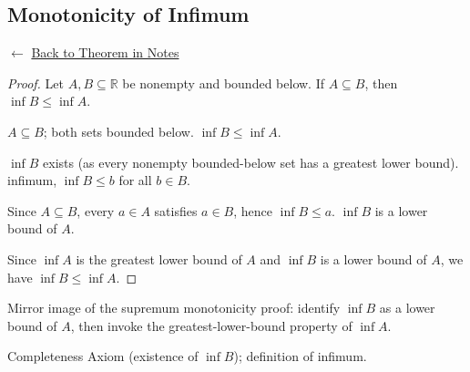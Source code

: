 
\subsection*{Monotonicity of Infimum}
\label{prf:monotonicity-of-infimum}

\begin{remark*}[Return]
$\leftarrow$ \hyperref[thm:monotonicity]{Back to Theorem in Notes}
\end{remark*}

\begin{proof}
\Claim Let $A, B \subseteq \mathbb{R}$ be nonempty and bounded below.
If $A \subseteq B$, then $\inf B \le \inf A$.

\Given $A \subseteq B$; both sets bounded below.
\Goal $\inf B \le \inf A$.

 $\inf B$ exists (as every nonempty bounded-below set
has a greatest lower bound).
\ByDef infimum, $\inf B \le b$ for all $b \in B$.

Since $A \subseteq B$, every $a \in A$ satisfies $a \in B$, hence $\inf B \le a$.
\Therefore $\inf B$ is a lower bound of $A$.

Since $\inf A$ is the greatest lower bound of $A$ and $\inf B$ is a lower
bound of $A$, we have $\inf B \le \inf A$. \AsReq
\end{proof}

\begin{remark*}
Mirror image of the supremum monotonicity proof: identify $\inf B$ as a lower
bound of $A$, then invoke the greatest-lower-bound property of $\inf A$.
\end{remark*}

\begin{remark*}[Dependencies]
Completeness Axiom (existence of $\inf B$); definition of infimum.
\end{remark*}
